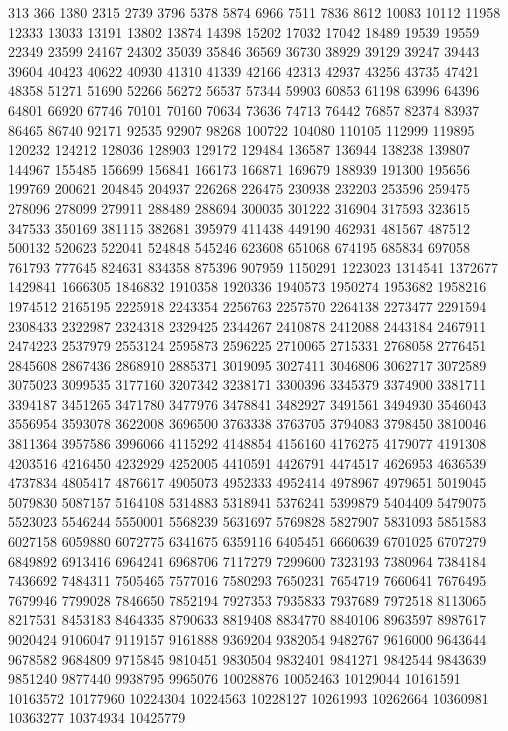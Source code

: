 313
366
1380
2315
2739
3796
5378
5874
6966
7511
7836
8612
10083
10112
11958
12333
13033
13191
13802
13874
14398
15202
17032
17042
18489
19539
19559
22349
23599
24167
24302
35039
35846
36569
36730
38929
39129
39247
39443
39604
40423
40622
40930
41310
41339
42166
42313
42937
43256
43735
47421
48358
51271
51690
52266
56272
56537
57344
59903
60853
61198
63996
64396
64801
66920
67746
70101
70160
70634
73636
74713
76442
76857
82374
83937
86465
86740
92171
92535
92907
98268
100722
104080
110105
112999
119895
120232
124212
128036
128903
129172
129484
136587
136944
138238
139807
144967
155485
156699
156841
166173
166871
169679
188939
191300
195656
199769
200621
204845
204937
226268
226475
230938
232203
253596
259475
278096
278099
279911
288489
288694
300035
301222
316904
317593
323615
347533
350169
381115
382681
395979
411438
449190
462931
481567
487512
500132
520623
522041
524848
545246
623608
651068
674195
685834
697058
761793
777645
824631
834358
875396
907959
1150291
1223023
1314541
1372677
1429841
1666305
1846832
1910358
1920336
1940573
1950274
1953682
1958216
1974512
2165195
2225918
2243354
2256763
2257570
2264138
2273477
2291594
2308433
2322987
2324318
2329425
2344267
2410878
2412088
2443184
2467911
2474223
2537979
2553124
2595873
2596225
2710065
2715331
2768058
2776451
2845608
2867436
2868910
2885371
3019095
3027411
3046806
3062717
3072589
3075023
3099535
3177160
3207342
3238171
3300396
3345379
3374900
3381711
3394187
3451265
3471780
3477976
3478841
3482927
3491561
3494930
3546043
3556954
3593078
3622008
3696500
3763338
3763705
3794083
3798450
3810046
3811364
3957586
3996066
4115292
4148854
4156160
4176275
4179077
4191308
4203516
4216450
4232929
4252005
4410591
4426791
4474517
4626953
4636539
4737834
4805417
4876617
4905073
4952333
4952414
4978967
4979651
5019045
5079830
5087157
5164108
5314883
5318941
5376241
5399879
5404409
5479075
5523023
5546244
5550001
5568239
5631697
5769828
5827907
5831093
5851583
6027158
6059880
6072775
6341675
6359116
6405451
6660639
6701025
6707279
6849892
6913416
6964241
6968706
7117279
7299600
7323193
7380964
7384184
7436692
7484311
7505465
7577016
7580293
7650231
7654719
7660641
7676495
7679946
7799028
7846650
7852194
7927353
7935833
7937689
7972518
8113065
8217531
8453183
8464335
8790633
8819408
8834770
8840106
8963597
8987617
9020424
9106047
9119157
9161888
9369204
9382054
9482767
9616000
9643644
9678582
9684809
9715845
9810451
9830504
9832401
9841271
9842544
9843639
9851240
9877440
9938795
9965076
10028876
10052463
10129044
10161591
10163572
10177960
10224304
10224563
10228127
10261993
10262664
10360981
10363277
10374934
10425779
